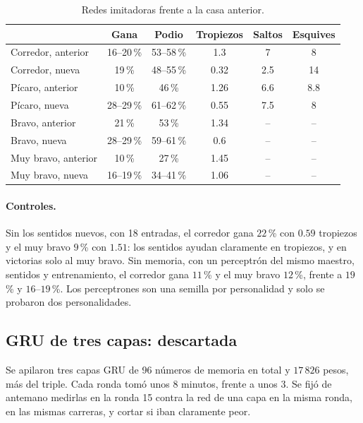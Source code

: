 \documentclass[11pt,letterpaper]{article}
\begin{document}
\begin{table}[h]\centering\small
\begin{tabular}{lccccc}
\toprule
 & Gana & Podio & Tropiezos & Saltos & Esquives \\
\midrule
Corredor, anterior & 16--20\,\% & 53--58\,\% & 1.3 & 7 & 8 \\
Corredor, nueva & 19\,\% & 48--55\,\% & 0.32 & 2.5 & 14 \\
Pícaro, anterior & 10\,\% & 46\,\% & 1.26 & 6.6 & 8.8 \\
Pícaro, nueva & 28--29\,\% & 61--62\,\% & 0.55 & 7.5 & 8 \\
Bravo, anterior & 21\,\% & 53\,\% & 1.34 & -- & -- \\
Bravo, nueva & 28--29\,\% & 59--61\,\% & 0.6 & -- & -- \\
Muy bravo, anterior & 10\,\% & 27\,\% & 1.45 & -- & -- \\
Muy bravo, nueva & 16--19\,\% & 34--41\,\% & 1.06 & -- & -- \\
\bottomrule
\end{tabular}
\caption{Redes imitadoras frente a la casa anterior.}
\label{tab:imita}
\end{table}

\paragraph{Controles.} Sin los sentidos nuevos, con 18 entradas, el corredor gana $22$\,\% con $0.59$ tropiezos y el muy bravo $9$\,\% con $1.51$: los sentidos ayudan claramente en tropiezos, y en victorias solo al muy bravo. Sin memoria, con un perceptrón del mismo maestro, sentidos y entrenamiento, el corredor gana $11$\,\% y el muy bravo $12$\,\%, frente a $19$\,\% y $16$--$19$\,\%. Los perceptrones son una semilla por personalidad y solo se probaron dos personalidades.

\subsection{GRU de tres capas: descartada}
Se apilaron tres capas GRU de 96 números de memoria en total y $17\,826$ pesos, más del triple. Cada ronda tomó unos 8 minutos, frente a unos 3. Se fijó de antemano medirlas en la ronda 15 contra la red de una capa en la misma ronda, en las mismas carreras, y cortar si iban claramente peor.
\end{document}
